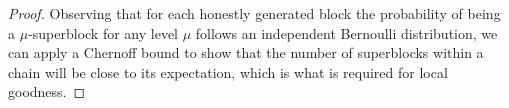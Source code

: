 \begin{proof}
Observing that for each honestly generated block the probability of being a
$\mu$-superblock for any level $\mu$ follows an independent Bernoulli
distribution, we can apply a Chernoff bound to show that the number of
superblocks within a chain will be close to its expectation, which is what
is required for local goodness.
\end{proof}
